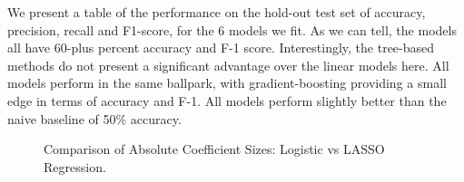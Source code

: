 \documentclass{article}
\begin{document}
We present a table of the performance on the hold-out test set of accuracy, precision, recall and F1-score, for the 6 models we fit. As we can tell, the models all have 60-plus percent accuracy and F-1 score. Interestingly, the tree-based methods do not present a significant advantage over the linear models here. All models perform in the same ballpark, with gradient-boosting providing a small edge in terms of accuracy and F-1. All models perform slightly better than the naive baseline of 50\% accuracy.\\

\begin{figure}[h!]
\centering
{}
\caption{Comparison of Absolute Coefficient Sizes: Logistic vs LASSO Regression.}
\label{fig:coeff_comparison}
\end{figure}
\end{document}
